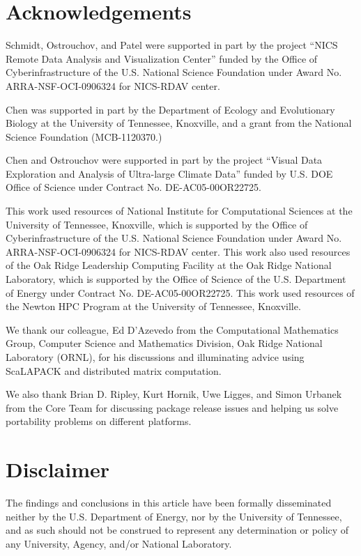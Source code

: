 \section*{Acknowledgements}

Schmidt, Ostrouchov, and Patel were supported in part by the project
``NICS Remote Data Analysis and Visualization Center''
funded by the Office of Cyberinfrastructure of the
U.S. National Science Foundation
under Award No. ARRA-NSF-OCI-0906324 for NICS-RDAV center.

Chen was supported in part by
the Department of Ecology and Evolutionary Biology at the
University of Tennessee, Knoxville, and a grant from
the National Science Foundation (MCB-1120370.)

Chen and Ostrouchov were supported in part by the project
``Visual Data Exploration and Analysis of Ultra-large Climate Data''
funded by U.S. DOE Office of Science
under Contract No. DE-AC05-00OR22725.

This work used resources of National Institute for Computational
Sciences at the University of Tennessee, Knoxville, which is supported
by the Office of Cyberinfrastructure of the U.S. National Science Foundation
under Award No. ARRA-NSF-OCI-0906324 for NICS-RDAV center.
This work also used resources of the Oak Ridge Leadership Computing Facility
at the Oak Ridge National Laboratory, which is supported by the Office of
Science of the U.S. Department of Energy under Contract No. DE-AC05-00OR22725.
This work used resources of the Newton HPC Program at the University of
Tennessee, Knoxville. 

We thank our colleague, Ed D'Azevedo from the Computational Mathematics 
Group, Computer Science and Mathematics Division, Oak Ridge National 
Laboratory (ORNL), for his discussions and illuminating advice using 
ScaLAPACK and distributed matrix computation.

We also thank Brian D. Ripley, Kurt Hornik, Uwe Ligges, and Simon Urbanek
from the  Core Team for discussing package release issues and
helping us solve portability problems on different platforms.


\section*{Disclaimer}
The findings and conclusions in this article have been formally disseminated
neither by the U.S. Department of Energy, nor by the University of Tennessee,
and as such should not be construed to represent any determination or policy of
any University, Agency, and/or National Laboratory.

